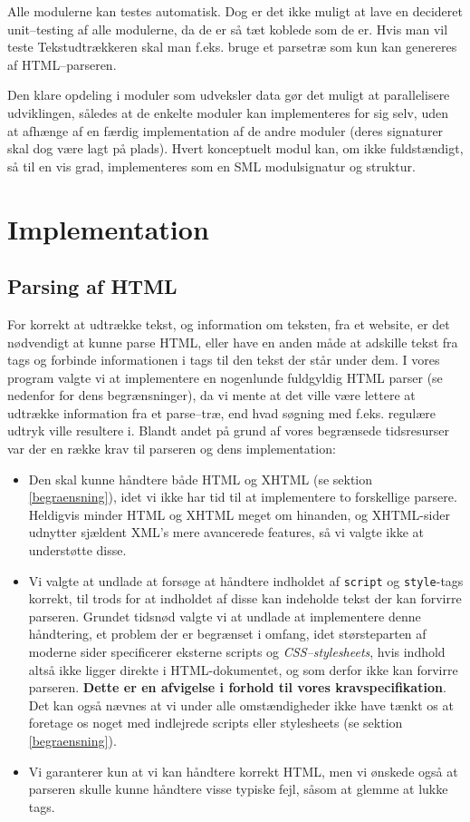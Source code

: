 \documentclass[a4paper,oneside]{memoir}
\begin{document}
Alle modulerne kan testes automatisk. Dog er det ikke muligt at lave
en decideret unit--testing af alle modulerne, da de er så tæt koblede
som de er. Hvis man vil teste Tekstudtrækkeren skal man f.eks. bruge
et parsetræ som kun kan genereres af HTML--parseren.

Den klare opdeling i moduler som udveksler data gør det muligt at
parallelisere udviklingen, således at de enkelte moduler kan
implementeres for sig selv, uden at afhænge af en færdig
implementation af de andre moduler (deres signaturer skal dog være
lagt på plads). Hvert konceptuelt modul kan, om ikke fuldstændigt, så
til en vis grad, implementeres som en SML modulsignatur og struktur.

\chapter{Implementation}

\section{Parsing af HTML}
\label{htmlparserimpl}
For korrekt at udtrække tekst, og information om teksten, fra et
website, er det nødvendigt at kunne parse HTML, eller have en anden
måde at adskille tekst fra tags og forbinde informationen i tags til
den tekst der står under dem. I vores program valgte vi at
implementere en nogenlunde fuldgyldig HTML parser (se nedenfor for
dens begrænsninger), da vi mente at det ville være lettere at udtrække
information fra et parse--træ, end hvad søgning med f.eks. regulære
udtryk ville resultere i. Blandt andet på grund af vores begrænsede
tidsresurser var der en række krav til parseren og dens
implementation:

\begin{itemize}
\item Den skal kunne håndtere både HTML og XHTML (se sektion
  \ref{begraensning}), idet vi ikke har tid til at implementere to
  forskellige parsere. Heldigvis minder HTML og XHTML meget om
  hinanden, og XHTML-sider udnytter sjældent XML's mere avancerede
  features, så vi valgte ikke at understøtte disse.
\item Vi valgte at undlade at forsøge at håndtere indholdet af
  \texttt{script} og \texttt{style}-tags korrekt, til trods for at
  indholdet af disse kan indeholde tekst der kan forvirre
  parseren. Grundet tidsnød valgte vi at undlade at implementere denne
  håndtering, et problem der er begrænset i omfang, idet størsteparten
  af moderne sider specificerer eksterne scripts og
  \textit{CSS--stylesheets}, hvis indhold altså ikke ligger direkte i
  HTML-dokumentet, og som derfor ikke kan forvirre
  parseren. \textbf{Dette er en afvigelse i forhold til vores
  kravspecifikation}. Det kan også nævnes at vi under alle
  omstændigheder ikke have tænkt os at foretage os noget med
  indlejrede scripts eller stylesheets (se sektion
  \ref{begraensning}).
\item Vi garanterer kun at vi kan håndtere korrekt HTML, men vi
  ønskede også at parseren skulle kunne håndtere visse typiske fejl,
  såsom at glemme at lukke tags.
\end{itemize}
\end{document}

